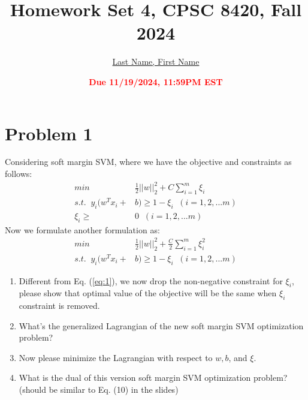 \documentclass[11pt]{article}
\title{{\bf Homework Set 4, CPSC 8420, Fall 2024}} %
\author{\Large\underline{Last Name, First Name}}
\date{\textbf{\Large\textcolor{red}{Due 11/19/2024, 11:59PM EST}}} %
\begin{document}
\maketitle

\section*{Problem 1}
Considering soft margin SVM, where we have the objective and constraints as follows:
\begin{equation}\label{eq:1}
	\begin{aligned}
		min\;\; &\frac{1}{2}||w||_2^2 +C\sum\limits_{i=1}^{m}\xi_i\\s.t.  \;\; y_i(w^Tx_i + &b)  \geq 1 - \xi_i \;\;(i =1,2,...m)\\\xi_i \geq &0 \;\;(i =1,2,...m)
	\end{aligned}
\end{equation}
Now we formulate another formulation as:
\begin{equation}
	\begin{aligned}
		min\;\; &\frac{1}{2}||w||_2^2 +\frac{C}{2}\sum\limits_{i=1}^{m}\xi_i^2\\s.t.  \;\; y_i(w^Tx_i + &b)  \geq 1 - \xi_i \;\;(i =1,2,...m)
	\end{aligned}
\end{equation}
\begin{enumerate}
	\item Different from Eq. (\ref{eq:1}), we now drop the non-negative constraint for $\xi_i$, please show that optimal value of the objective will be the same when $\xi_i$ constraint is removed.
	\item What's the generalized Lagrangian of the new soft margin SVM optimization problem?
	\item Now please minimize the Lagrangian with respect to $w, b$, and $\xi$.
	\item What is the dual of this version soft margin SVM optimization problem? (should be similar to Eq. (10) in the slides)
\end{enumerate}
\end{document}
